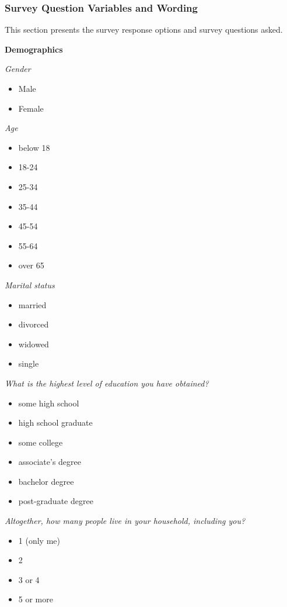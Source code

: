 \documentclass[12pt]{article}
\begin{document}
\clearpage

\subsubsection*{Survey Question Variables and Wording}

This section presents the survey response options and survey questions asked. 

\textbf{Demographics}

\emph{Gender}
\begin{itemize}
\item Male
\item Female
\end{itemize}

\emph{Age}
\begin{itemize}
\item below 18
\item 18-24
\item 25-34
\item 35-44
\item 45-54
\item 55-64
\item over 65
\end{itemize}

\emph{Marital status}
\begin{itemize}
\item married
\item divorced
\item widowed
\item single
\end{itemize}
 
 
\emph{What is the highest level of education you have obtained?}
\begin{itemize}
\item some high school
\item high school graduate
\item some college
\item associate’s degree
\item bachelor degree
\item post-graduate degree
\end{itemize}

\emph{Altogether, how many people live in your household, including you?}
\begin{itemize}
\item 1 (only me)
\item 2
\item 3 or 4
\item 5 or more
\end{itemize}
\end{document}
